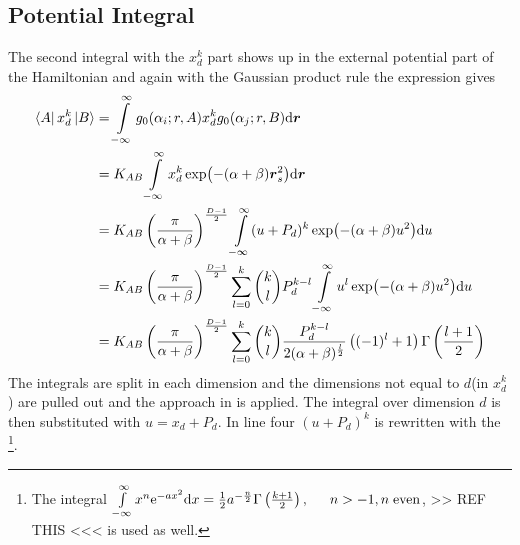 \subsection{Potential Integral}
    The second integral with the $x^k_d$ part shows up in the external
    potential part of the Hamiltonian and again with the Gaussian product rule
    the expression gives
        \begin{align}
            \bra{A}x^k_d\ket{B} &= \int\limits^{\infty}_{-\infty} g_0(\alpha_i;r,A) x^k_d
            g_0(\alpha_j;r,B) \mathrm{d} \boldsymbol{{r}} \nonumber \\
            &= K_{AB} \int\limits^{\infty}_{-\infty} x^k_d \exp(-(\alpha+\beta)\boldsymbol{{r}}^2_s)
            \mathrm{d}\boldsymbol{{r}} \nonumber \\
            &= K_{AB} \left(\frac{\pi}{\alpha+\beta}\right)^{\frac{D-1}{2}}
            \int\limits^{\infty}_{-\infty} (u+P_d)^k\exp(-(\alpha+\beta)u^2) \mathrm{d} u \nonumber \\
            &= K_{AB} \left(\frac{\pi}{\alpha+\beta}\right)^{\frac{D-1}{2}}
            \sum\limits_{l=0}^k {k\choose l} P^{k-l}_d \int\limits^{\infty}_{-\infty}
            u^l\exp(-(\alpha+\beta)u^2) \mathrm{d} u \nonumber \\
            &= K_{AB} \left(\frac{\pi}{\alpha+\beta}\right)^{\frac{D-1}{2}}
            \sum\limits_{l=0}^k {k\choose l}
            \frac{P^{k-l}_d}{2(\alpha+\beta)^{\frac{l}{2}}}
            \left((-1)^l+1\right) \Gamma\left(\frac{l+1}{2}\right)
        \end{align}
    The integrals are split in each dimension and the dimensions not equal to
    $d$(in $x^k_d$) are pulled out and the approach in  is
    applied. The integral over dimension $d$ is then substituted with
    $u=x_d+P_d$. In line four $(u+P_d)^k$ is rewritten with the \footnote{The integral $\infint x^n\me^{-ax^2}\md x =
    \frac{1}{2}a^{-\frac{n}{2}}\Gamma\left(\frac{k+1}{2}\right),\indent n>-1,
    n\;\text{even}$, >> REF THIS <<< is used as well.}.

